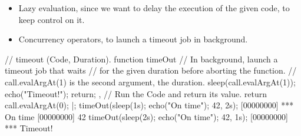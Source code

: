 \begin{itemize}
\item Lazy evaluation, since we want to delay the execution of the
  given code, to keep control on it.
\item Concurrency operators, to launch a timeout job in background.
\end{itemize}

\begin{urbiscript}
// timeout (Code, Duration).
function timeOut
{
  // In background, launch a timeout job that waits
  // for the given duration before aborting the function.
  // call.evalArgAt(1) is the second argument, the duration.
  {
    sleep(call.evalArgAt(1));
    echo("Timeout!");
    return;
  },
  // Run the Code and return its value.
  return call.evalArgAt(0);
} |;
timeOut({sleep(1s); echo("On time"); 42}, 2s);
[00000000] *** On time
[00000000] 42
timeOut({sleep(2s); echo("On time"); 42}, 1s);
[00000000] *** Timeout!
\end{urbiscript}



